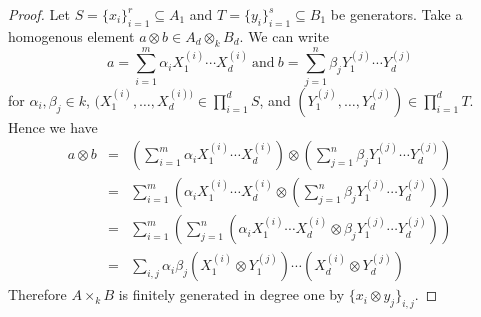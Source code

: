 \begin{proof}
  Let \(S = \{x_i\}_{i = 1}^r \subseteq A_1\) and \(T = \{y_i\}_{i = 1}^s \subseteq B_1\) be generators.
  Take a homogenous element \(a \otimes b \in A_d \otimes_k B_d\).
  We can write
  \[a = \sum_{i = 1}^m \alpha_i X_1^{(i)} \cdots X_d^{(i)}\ \text{and}\ b = \sum_{j = 1}^n \beta_j Y_1^{(j)} \cdots Y_d^{(j)}\]
  for \(\alpha_i,\beta_j \in k\), \((X_1^{(i)}, \ldots, X_d^{(i))} \in \prod_{i = 1}^d S\), and \((Y_1^{(j)}, \ldots, Y_d^{(j)}) \in \prod_{i = 1}^d T\).
  Hence we have
  \begin{eqnarray*}
    a \otimes b &=& \left(\sum_{i=1}^m \alpha_i X_1^{(i)} \cdots X_d^{(i)}\right) \otimes \left(\sum_{j = 1}^n \beta_j Y_1^{(j)} \cdots Y_d^{(j)}\right)\\
    &=& \sum_{i = 1}^m\left(\alpha_i X_1^{(i)} \cdots X_d^{(i)} \otimes \left(\sum_{j = 1}^n \beta_j Y_1^{(j)} \cdots Y_d^{(j)}\right)\right)\\
    &=& \sum_{i = 1}^m\left(\sum_{j = 1}^n\left(\alpha_i  X_1^{(i)} \cdots X_d^{(i)} \otimes \beta_j Y_1^{(j)} \cdots Y_d^{(j)}\right)\right)\\
    &=& \sum_{i,j} \alpha_i\beta_j (X_1^{(i)} \otimes Y_1^{(j)}) \cdots (X_d^{(i)} \otimes Y_d^{(j)})
  \end{eqnarray*}
    Therefore \(A \times_k B\) is finitely generated in degree one by \(\{x_i \otimes y_j\}_{i,j}\).

\end{proof}

